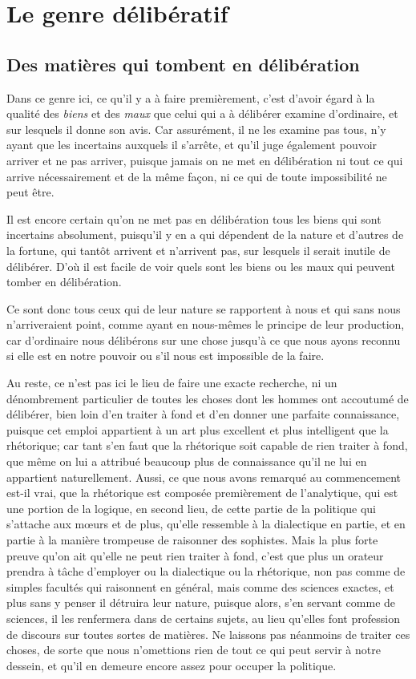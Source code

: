 
\chapter{Le genre délibératif}
\section{Des matières qui tombent en délibération}

Dans ce genre ici, ce qu'il y a à faire premièrement, c'est d'avoir égard à la qualité des \emph{biens} et des
\emph{maux} que celui qui a à délibérer examine d'ordinaire, et sur lesquels il donne son avis. Car assurément,
il ne les examine pas tous, n'y ayant que les incertains auxquels il s'arrête, et qu'il juge également pouvoir
arriver et ne pas arriver, puisque jamais on ne met en délibération ni tout ce qui arrive nécessairement et de
la même façon, ni ce qui de toute impossibilité ne peut être.

Il est encore certain qu'on ne met pas en délibération tous les biens qui sont incertains absolument, puisqu'il
y en a qui dépendent de la nature et d'autres de la fortune, qui tantôt arrivent et n'arrivent pas, sur lesquels
il serait inutile de délibérer. D'où il est facile de voir quels sont les biens ou les maux qui peuvent tomber
en délibération.

Ce sont donc tous ceux qui de leur nature se rapportent à nous et qui sans nous n'arriveraient point, comme ayant
en nous-mêmes le principe de leur production, car d'ordinaire nous délibérons sur une chose jusqu'à ce que nous
ayons reconnu si elle est en notre pouvoir ou s'il nous est impossible de la faire.

Au reste, ce n'est pas ici le lieu de faire une exacte recherche, ni un dénombrement particulier de toutes les
choses dont les hommes ont accoutumé de délibérer, bien loin d'en traiter à fond et d'en donner une parfaite
connaissance, puisque cet emploi appartient à un art plus excellent et plus intelligent que la rhétorique; car
tant s'en faut que la rhétorique soit capable de rien traiter à fond, que même on lui a attribué beaucoup plus de
connaissance qu'il ne lui en appartient naturellement. Aussi, ce que nous avons remarqué au commencement est-il
vrai, que la rhétorique est composée premièrement de l'analytique, qui est une portion de la logique, en second lieu,
de cette partie de la politique qui s'attache aux mœurs et de plus, qu'elle ressemble à la dialectique en partie, et
en partie à la manière trompeuse de raisonner des sophistes. Mais la plus forte preuve qu'on ait qu'elle ne peut rien
traiter à fond, c'est que plus un orateur prendra à tâche d'employer ou la dialectique ou la rhétorique, non pas
comme de simples facultés qui raisonnent en général, mais comme des sciences exactes, et plus sans y penser il détruira
leur nature, puisque alors, s'en servant comme de sciences, il les renfermera dans de certains sujets, au lieu qu'elles
font profession de discours sur toutes sortes de matières. Ne laissons pas néanmoins de traiter ces choses, de sorte
que nous n'omettions rien de tout ce qui peut servir à notre dessein, et qu'il en demeure encore assez pour occuper la
politique.

